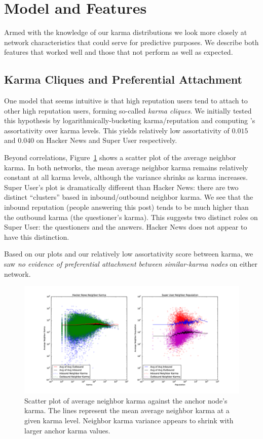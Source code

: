 \documentclass[11pt]{article}
\begin{document}
\section{Model and Features}
\label{sec:model}

Armed with the knowledge of our karma distributions we look more closely at network
characteristics that could serve for predictive purposes. We describe
both features that worked well and those that not perform as well 
as expected.

\subsection{Karma Cliques and Preferential Attachment}
\label{sec:karma_cliques}

One model that seems intuitive is that high reputation users tend to attach to
other high reputation users, forming so-called \textit{karma cliques}. We
initially tested this hypothesis by logarithmically-bucketing karma/reputation
and computing \citet{newman2003mixing}'s assortativity over karma levels. This
yields relatively low assortativity of $0.015$ and $0.040$ on Hacker News and
Super User respectively.

Beyond correlations, Figure~\ref{fig:karma_cliques} shows a scatter plot of the
average neighbor karma. In both networks, the mean average neighbor
karma remains relatively constant at all karma levels, although the variance
shrinks as karma increases.  Super User's plot is dramatically different than
Hacker News: there are two distinct ``clusters'' based in inbound/outbound neighbor
karma. We see that the inbound reputation (people answering this
post) tends to be much higher than the outbound karma (the questioner's karma).
This suggests two distinct roles on Super User: the questioners and the answers.
Hacker News does not appear to have this distinction.

Based on our plots and our relatively low assortativity score between karma, we
saw \textit{no evidence of preferential attachment between similar-karma nodes}
on either network.

\begin{figure}[t]
\centering
\includegraphics[width=\linewidth]{karma_cliques-png}
\caption{Scatter plot of average neighbor karma against the anchor node's karma. 
The lines represent the mean average neighbor karma at a given karma level.
Neighbor karma variance appears to shrink with larger anchor karma values.}
\label{fig:karma_cliques}
\end{figure}
\end{document}
